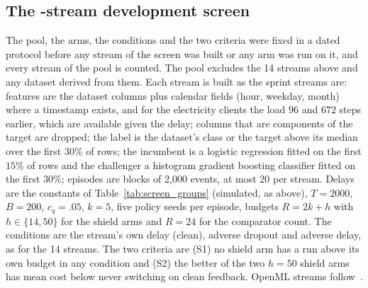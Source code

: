 \documentclass[10pt]{article}
\theoremstyle{plain}
\theoremstyle{definition}
\begin{document}
\subsection{The \ScreenPool-stream development screen}\label{app:screen}
The pool, the arms, the conditions and the two criteria were fixed in a dated protocol before any stream of the screen was built or any arm was run on it, and every stream of the pool is counted. The pool excludes the 14 streams above and any dataset derived from them. Each stream is built as the sprint streams are: features are the dataset columns plus calendar fields (hour, weekday, month) where a timestamp exists, and for the electricity clients the load $96$ and $672$ steps earlier, which are available given the delay; columns that are components of the target are dropped; the label is the dataset's class or the target above its median over the first $30\%$ of rows; the incumbent is a logistic regression fitted on the first $15\%$ of rows and the challenger a histogram gradient boosting classifier fitted on the first $30\%$; episodes are blocks of 2{,}000 events, at most 20 per stream. Delays are the constants of Table~\ref{tab:screen_groups} (simulated, as above), $T=2000$, $B=200$, $c_q=.05$, $k=5$, five policy seeds per episode, budgets $R=2k+h$ with $h\in\{14,50\}$ for the shield arms and $R=24$ for the comparator count. The conditions are the stream's own delay (clean), adverse dropout and adverse delay, as for the 14 streams. The two criteria are (S1) no shield arm has a run above its own budget in any condition and (S2) the better of the two $h=50$ shield arms has mean cost below never switching on clean feedback. OpenML streams follow~\citep{vanschoren2014openml}.

\begin{table}[!htbp]
\caption{Groups of the public screen: source, label, simulated delay in events, number of streams in the pool and number that meet S2 (the better $h=50$ shield arm costs less than never switching on clean feedback).}\label{tab:screen_groups}
\centering\small

\end{table}

{\small}

{\small}
\end{document}
